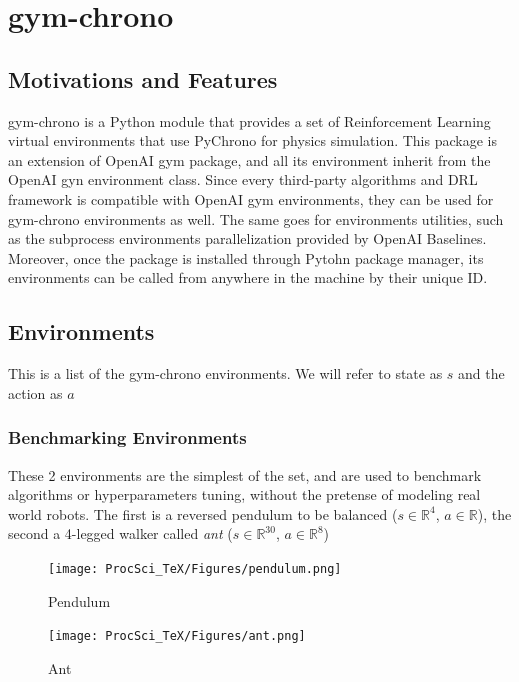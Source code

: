 \documentclass{svproc}
\begin{document}
\section{gym-chrono}
\subsection{Motivations and Features}
gym-chrono is a Python module that provides a set of Reinforcement Learning virtual environments that use PyChrono for physics simulation. This package is an extension of OpenAI gym package, and all its environment inherit from the OpenAI gyn environment class. Since every third-party algorithms and DRL framework is compatible with OpenAI gym environments, they can be used for gym-chrono environments as well. The same goes for environments utilities, such as the subprocess environments parallelization provided by OpenAI Baselines. Moreover, once the package is installed through Pytohn package manager, its environments can be called from anywhere in the machine by their unique ID.

\subsection{Environments}
This is a list of  the gym-chrono environments. We will refer to state as $s$ and the action as $a$
\subsubsection{Benchmarking Environments}
These 2 environments are the simplest of the set, and are used to benchmark algorithms or hyperparameters tuning, without the pretense of modeling real world robots. The first is a reversed pendulum to be balanced ($s \in \mathbb{R}^4$, $a \in \mathbb{R}$), the second a 4-legged walker called \textit{ant} ($s \in \mathbb{R}^{30}$, $a \in \mathbb{R}^8$)

\begin{figure}[ht]
 \begin{minipage}[b]{0.6\linewidth}
    \centering
    \texttt{[image: ProcSci\_TeX/Figures/pendulum.png]}
    \caption{Pendulum}
    \label{fig:pendulum}
 \end{minipage}
 \hspace{0.4cm}
 \begin{minipage}[b]{0.6\linewidth}
    \centering
    \texttt{[image: ProcSci\_TeX/Figures/ant.png]}
    \caption{Ant}
    \label{fig:ant}
 \end{minipage}
\end{figure}
\end{document}
